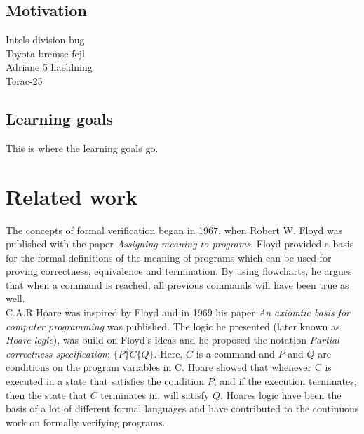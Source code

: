 \documentclass[a4paper]{report}
\begin{document}
\section{Motivation}
Intels-division bug \\
Toyota bremse-fejl\\
Adriane 5 haeldning\\
Terac-25\\
\section{Learning goals}
This is where the learning goals go.
\chapter{Related work}
The concepts of formal verification began in 1967, when Robert W. Floyd was published with the paper \textit{Assigning meaning to programs}\cite{Floyd1967}. Floyd provided a basis for the formal definitions of the meaning of programs which can be used for proving correctness, equivalence and termination. By using flowcharts, he argues that when a command is reached, all previous commands will have been true as well.\\ C.A.R Hoare was inspired by Floyd and in 1969 his paper \textit{An axiomtic basis for computer programming}\cite{Hoare1969} was published. The logic he presented (later known as \textit{Hoare logic}), was build on Floyd's ideas and he proposed the notation \textit{Partial correctness specification}; $\{P\} C \{Q\}$. Here, $C$ is a command and $P$ and $Q$ are conditions on the program variables in C. Hoare showed that whenever C is executed in a state that satisfies the condition $P$, and if the execution terminates, then the state that $C$ terminates in, will satisfy $Q$. Hoares logic have been the basis of a lot of different formal languages and have contributed to the continuous work on formally verifying programs.  \\ 
\end{document}
